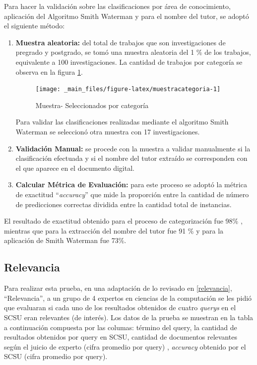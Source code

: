 \documentclass[
  12pt,
  openany]{book}
\begin{document}
Para hacer la validación sobre las clasificaciones por área de conocimiento, aplicación del Algoritmo Smith Waterman y para el nombre del tutor, se adoptó el siguiente método:

\begin{enumerate}
\def\labelenumi{\arabic{enumi}.}
\item
  \textbf{Muestra aleatoria:} del total de trabajos que son investigaciones de pregrado y postgrado, se tomó una muestra aleatoria del 1 \% de los trabajos, equivalente a 100 investigaciones. La cantidad de trabajos por categoría se observa en la figura \ref{fig:muestracategoria}.

  \begin{figure}

  {\centering \texttt{[image: \_main\_files/figure-latex/muestracategoria-1]} 

  }

  \caption{Muestra- Seleccionados por categoría}\label{fig:muestracategoria}
  \end{figure}

  Para validar las clasificaciones realizadas mediante el algoritmo Smith Waterman se seleccionó otra muestra con 17 investigaciones.
\item
  \textbf{Validación Manual:} se procede con la muestra a validar manualmente si la clasificación efectuada y si el nombre del tutor extraído se corresponden con el que aparece en el documento digital.
\item
  \textbf{Calcular Métrica de Evaluación:} para este proceso se adoptó la métrica de exactitud ``\emph{accuracy}'' que mide la proporción entre la cantidad de número de predicciones correctas dividida entre la cantidad total de instancias.
\end{enumerate}

El resultado de exactitud obtenido para el proceso de categorización fue 98\% , mientras que para la extracción del nombre del tutor fue 91 \% y para la aplicación de Smith Waterman fue 73\%.

\hypertarget{pruebas3}{%
\subsection{Relevancia}\label{pruebas3}}

Para realizar esta prueba, en una adaptación de lo revisado en \ref{relevancia}, ``Relevancia'', a un grupo de 4 expertos en ciencias de la computación se les pidió que evaluaran si cada uno de los resultados obtenidos de cuatro \emph{querys} en el SCSU eran relevantes (de interés). Los datos de la prueba se muestran en la tabla a continuación compuesta por las columas: término del query, la cantidad de resultados obtenidos por query en SCSU, cantidad de documentos relevantes según el juicio de experto (cifra promedio por query) , \emph{accuracy} obtenido por el SCSU (cifra promedio por query).
\end{document}

